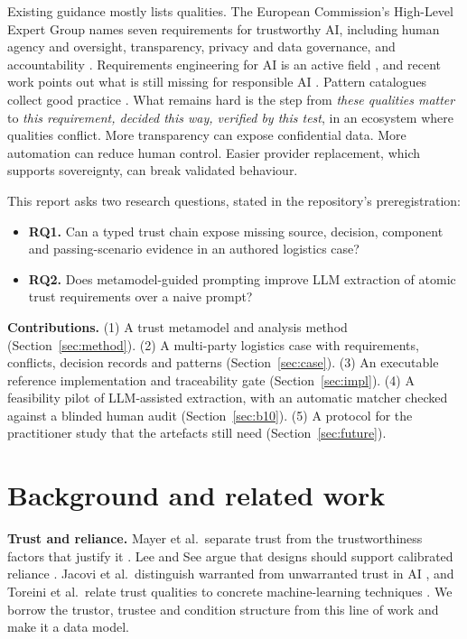 \documentclass[10pt,twocolumn]{article}
\begin{document}
Existing guidance mostly lists qualities. The European Commission's High-Level Expert Group names seven requirements for trustworthy AI, including human agency and oversight, transparency, privacy and data governance, and accountability \cite{hleg2019}. Requirements engineering for AI is an active field \cite{ahmad2023,vogelsang2019,habibullah2024}, and recent work points out what is still missing for responsible AI \cite{zowghi2023}. Pattern catalogues collect good practice \cite{lu2024}. What remains hard is the step from \emph{these qualities matter} to \emph{this requirement, decided this way, verified by this test}, in an ecosystem where qualities conflict. More transparency can expose confidential data. More automation can reduce human control. Easier provider replacement, which supports sovereignty, can break validated behaviour.

This report asks two research questions, stated in the repository's preregistration:
\begin{itemize}\setlength\itemsep{0pt}
\item \textbf{RQ1.} Can a typed trust chain expose missing source, decision, component and passing-scenario evidence in an authored logistics case?
\item \textbf{RQ2.} Does metamodel-guided prompting improve LLM extraction of atomic trust requirements over a naive prompt?
\end{itemize}

\textbf{Contributions.} (1) A trust metamodel and analysis method (Section~\ref{sec:method}). (2) A multi-party logistics case with \NReq{} requirements, \NConflicts{} conflicts, \NDecisions{} decision records and \NPatterns{} patterns (Section~\ref{sec:case}). (3) An executable reference implementation and traceability gate (Section~\ref{sec:impl}). (4) A feasibility pilot of LLM-assisted extraction, with an automatic matcher checked against a blinded human audit (Section~\ref{sec:b10}). (5) A protocol for the practitioner study that the artefacts still need (Section~\ref{sec:future}).

\section{Background and related work}
\textbf{Trust and reliance.} Mayer et al.\ separate trust from the trustworthiness factors that justify it \cite{mayer1995}. Lee and See argue that designs should support calibrated reliance \cite{lee2004}. Jacovi et al.\ distinguish warranted from unwarranted trust in AI \cite{jacovi2021}, and Toreini et al.\ relate trust qualities to concrete machine-learning techniques \cite{toreini2020}. We borrow the trustor, trustee and condition structure from this line of work and make it a data model.
\end{document}
